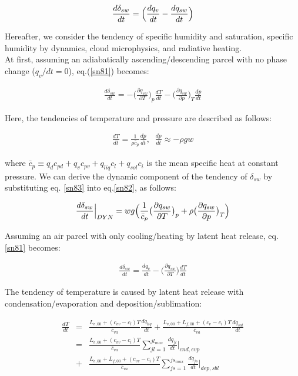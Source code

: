 \begin{eqnarray}
\frac{d \delta_{sw}}{dt}=\Bigl(\frac{dq_{v}}{dt}-\frac{dq_{sw}}{dt}\Bigr)\label{sn81}
\end{eqnarray}

Hereafter, we consider the tendency of specific humidity and saturation, specific humidity by dynamics, cloud microphysics, and radiative heating.\\
At first, assuming an adiabatically ascending/descending parcel with no phase change ($q_{v}/dt = 0$), eq.(\ref{sn81}) becomes:

\begin{eqnarray}
\frac{d\delta_{sw}}{dt}=-\bigl(\frac{\partial q_{sw}}{\partial T}\bigr)_{p}\frac{dT}{dt}-\bigl(\frac{\partial q_{sw}}{\partial p}\bigr)_{T}\frac{dp}{dt}\label{sn82}
\end{eqnarray}

Here, the tendencies of temperature and pressure are described as follows:

\begin{eqnarray}
\frac{dT}{dt}=\frac{1}{\rho\bar{c}_{p}}\frac{dp}{dt},\;\;\frac{dp}{dt}\approx-\rho g w\label{sn83}
\end{eqnarray}

where $\bar{c}_{p}\equiv q_{d}c_{pd}+q_{v}c_{pv}+q_{liq}c_{l}+q_{sol}c_{i}$ is the mean specific heat at constant pressure. We can derive the dynamic component of the tendency of $\delta_{sw}$ by substituting eq. \ref{sn83} into eq.\ref{sn82}, as follows:

\begin{eqnarray}
\frac{d\delta_{sw}}{dt}\Bigr|_{DYN}=wg\Bigl(\frac{1}{\bar{c}_{p}}\bigl(\frac{\partial q_{sw}}{\partial T}\bigr)_{p}+\rho\bigl(\frac{\partial q_{sw}}{\partial p}\bigr)_{T}\Bigr)\label{sn84}
\end{eqnarray}

Assuming an air parcel with only cooling/heating by latent heat release, eq. \ref{sn81} becomes:

\begin{eqnarray}
\frac{d\delta_{sw}}{dt}=\frac{dq_{v}}{dt}-\bigl(\frac{\partial q_{sw}}{\partial T}\bigr)\frac{dT}{dt}\label{sn85}
\end{eqnarray}

The tendency of temperature is caused by latent heat release with condensation/evaporation and deposition/sublimation:  %

\begin{eqnarray}
\frac{dT}{dt}&=&\frac{L_{v,00}+(c_{vv}-c_{l})T}{\bar{c}_{va}}\frac{dq_{liq}}{dt}+\frac{L_{v,00}+L_{f,00}+(c_{v}-c_{i})T}{\bar{c}_{va}}\frac{dq_{sol}}{dt}\nonumber\\
&=&\frac{L_{v,00}+(c_{vv}-c_{l}) T}{\bar{c}_{va}} \sum^{jl_{max}}_{jl=1}\frac{dq_{jl}}{dt}\Bigr|_{cnd,evp}\nonumber\\
&+&\frac{L_{v,00}+L_{f,00}+(c_{vv}-c_{i})T}{\bar{c}_{va}}\sum^{js_{max}}_{js=1}\frac{dq_{js}}{dt}\Bigr|_{dep,sbl}\label{sn86}
\end{eqnarray}

